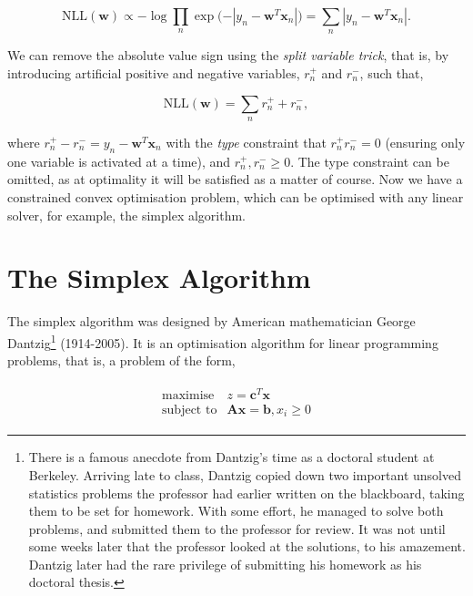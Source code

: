 \documentclass[11pt]{amsart}
\begin{document}
$$\text{NLL}(\mathbf{w}) \propto -\log\prod_n\exp\big({-|y_n- \mathbf{w}^T\mathbf{x}_n|}\big) = \sum_n |y_n- \mathbf{w}^T\mathbf{x}_n|.$$

We can remove the absolute value sign using the \emph{split variable trick}, that is, by introducing artificial positive and negative variables, $r_n^+$ and $r_n^-$, such that,

$$\text{NLL}(\mathbf{w}) =  \sum_n r_n^+ + r_n^-,$$

where $r_n^+ - r_n^- = y_n- \mathbf{w}^T\mathbf{x}_n$ with the \emph{type} constraint that $r_n^+r_n^- = 0$ (ensuring only one variable is activated at a time), and $r_n^+, r_n^- \geq 0$. The type constraint can be omitted, as at optimality it will be satisfied as a matter of course. Now we have a constrained convex optimisation problem, which can be optimised with any linear solver, for example, the simplex algorithm.

\section{The Simplex Algorithm}

The simplex algorithm was designed by American mathematician George Dantzig\footnote{There is a famous anecdote from Dantzig's time as a doctoral student at Berkeley. Arriving late to class, Dantzig copied down two important unsolved statistics problems the professor had earlier written on the blackboard, taking them to be set for homework. With some effort, he managed to solve both problems, and submitted them to the professor for review. It was not until some weeks later that the professor looked at the solutions, to his amazement. Dantzig later had the rare privilege of submitting his homework as his doctoral thesis.} (1914-2005). It is an optimisation algorithm for linear programming problems, that is, a problem of the form,

\begin{align}
\begin{array}{rl}
\text{maximise} & z = \mathbf{c}^T\mathbf{x} \\
\text{subject to} & \mathbf{A}\mathbf{x} = \mathbf{b}, x_i \geq 0
\end{array}
\label{eq:linprog}
\end{align}
\end{document}
